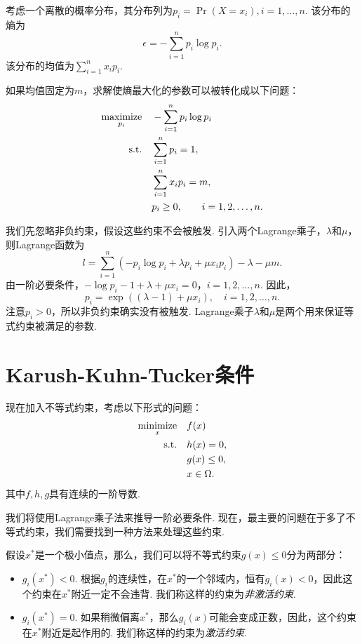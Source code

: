 \begin{example}[最大熵]\label{example:max-entropy}
考虑一个离散的概率分布，其分布列为$p_i=\Pr(X=x_i),i=1,\dots,n$. 该分布的熵为
\[\epsilon = -\sum_{i=1}^n p_i \log p_i.\]
该分布的均值为$\sum_{i=1}^n x_i p_i$. 

如果均值固定为$m$，求解使熵最大化的参数可以被转化成以下问题：
\begin{align*}
\operatorname*{maximize}_{p_i}\quad&-\sum_{i=1}^n p_i\log p_i \\
\text{s.t.}\quad& \sum_{i=1}^n p_i=1, \\
&\sum_{i=1}^n x_i p_i=m, \\
&p_i\geq 0, \qquad i=1,2,\dots,n.
\end{align*}

我们先忽略非负约束，假设这些约束不会被触发. 引入两个Lagrange乘子，$\lambda$和$\mu$，则Lagrange函数为
\[l=\sum_{i=1}^n (-p_i\log p_i+\lambda p_i+\mu x_ip_i)-\lambda-\mu m.\]
由一阶必要条件，$-\log p_i -1+\lambda+\mu x_i=0$，$i=1,2,\dots,n$. 因此，
\[p_i=\exp((\lambda-1)+\mu x_i),\quad i=1,2,\dots, n.\]
注意$p_i>0$，所以非负约束确实没有被触发. Lagrange乘子$\lambda$和$\mu$是两个用来保证等式约束被满足的参数. 
\end{example}

\section{Karush-Kuhn-Tucker条件}\label{sec:KKT}
现在加入不等式约束，考虑以下形式的问题：
\begin{equation}
\begin{aligned}
\operatorname*{minimize}_x\quad& f(x) \\
\text{s.t.}\quad& h(x)=0, \\
&g(x)\leq 0,\\
& x \in \Omega.
\end{aligned}\label{eq:ineq-constraint-inequality-differentiable}
\end{equation}
其中$f,h,g$具有连续的一阶导数. 

我们将使用Lagrange乘子法来推导一阶必要条件. 现在，最主要的问题在于多了不等式约束，我们需要找到一种方法来处理这些约束.

假设$x^*$是一个极小值点，那么，我们可以将不等式约束$g(x)\leq 0$分为两部分：
\begin{itemize}
    \item $g_i(x^*)<0$. 根据$g_i$的连续性，在$x^*$的一个邻域内，恒有$g_i(x)<0$，因此这个约束在$x^*$附近一定不会违背. 我们称这样的约束为\textit{非激活约束}.
    \item $g_i(x^*)=0$. 如果稍微偏离$x^*$，那么$g_i(x)$可能会变成正数，因此，这个约束在$x^*$附近是起作用的. 我们称这样的约束为\textit{激活约束}.
\end{itemize}

